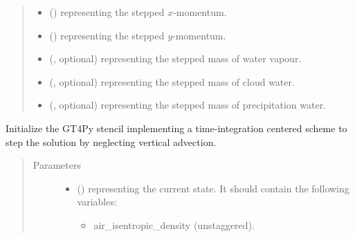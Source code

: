 \documentclass[letterpaper,10pt,english]{sphinxmanual}
\begin{document}
\begin{fulllineitems}
\begin{fulllineitems}
\begin{quote}
\begin{description}
\begin{itemize}
\item {} 
 () \textendash{}  representing the stepped \(x\)-momentum.

\item {} 
 () \textendash{}  representing the stepped \(y\)-momentum.

\item {} 
 (, optional) \textendash{}  representing the stepped mass of water vapour.

\item {} 
 (, optional) \textendash{}  representing the stepped mass of cloud water.

\item {} 
 (, optional) \textendash{}  representing the stepped mass of precipitation water.

\end{itemize}


\end{description}\end{quote}

\end{fulllineitems}


\begin{fulllineitems}
\label{\detokenize{api:dycore.prognostic_isentropic_centered.PrognosticIsentropicCentered._stencil_stepping_by_neglecting_vertical_advection_initialize}}
Initialize the GT4Py stencil implementing a time-integration centered scheme to step the solution
by neglecting vertical advection.
\begin{quote}\begin{description}
\item[{Parameters}] \leavevmode\begin{itemize}
\item {} 
 () \textendash{} 
{\hyperref[\detokenize{api:storages.state_isentropic.StateIsentropic}]{}} representing the current state.
It should contain the following variables:
\begin{itemize}
\item {} 
air\_isentropic\_density (unstaggered).


\end{itemize}
\end{itemize}
\end{description}
\end{quote}
\end{fulllineitems}
\end{fulllineitems}
\end{document}
